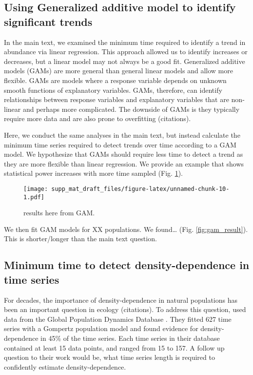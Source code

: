 \documentclass[12pt,]{article}
\begin{document}
\clearpage 

\subsection{Using Generalized additive model to identify significant
trends}\label{using-generalized-additive-model-to-identify-significant-trends}

In the main text, we examined the minimum time required to identify a
trend in abundance via linear regression. This approach allowed us to
identify increases or decreases, but a linear model may not always be a
good fit. Generalized additive models (GAMs) are more general than
general linear models and allow more flexible. GAMs are models where a
response variable depends on unknown smooth functions of explanatory
variables. GAMs, therefore, can identify relationships between response
variables and explanatory variables that are non-linear and perhaps more
complicated. The downside of GAMs is they typically require more data
and are also prone to overfitting (citations).

Here, we conduct the same analyses in the main text, but instead
calculate the minimum time series required to detect trends over time
according to a GAM model. We hypothesize that GAMs should require less
time to detect a trend as they are more flexible than linear regression.
We provide an example that shows statistical power increases with more
time sampled (Fig. \ref{fig:gam_example}).

\begin{figure}[htbp]
\centering
\texttt{[image: supp\_mat\_draft\_files/figure-latex/unnamed-chunk-10-1.pdf]}
\caption{results here from GAM.\label{fig:gam_example}}
\end{figure}

We then fit GAM models for XX populations. We found\ldots{} (Fig.
\ref{fig:gam_result}). This is shorter/longer than the main text
question.

\subsection{Minimum time to detect density-dependence in time
series}\label{minimum-time-to-detect-density-dependence-in-time-series}

For decades, the importance of density-dependence in natural populations
has been an important question in ecology (citations). To address this
question, \citet{Knape2012} used data from the Global Population
Dynamics Database \citep{GPDD2010}. They fitted 627 time series with a
Gompertz population model and found evidence for density-dependence in
45\% of the time series. Each time series in their database contained at
least 15 data points, and ranged from 15 to 157. A follow up question to
their work would be, what time series length is required to confidently
estimate density-dependence.

\clearpage

\renewcommand\refname{References}

\end{document}
